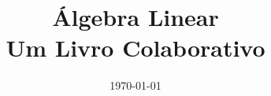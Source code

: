 \documentclass[a4paper]{book}
\newif\ifispdf        %
\theoremstyle{plain}
\theoremstyle{definition}
\begin{document}
\newcommand{\dir}{.} 

\frontmatter

\title{Álgebra Linear\\\small{Um Livro Colaborativo}}
\author{}
\date{\today}

\ifispdf
\addcontentsline{toc}{chapter}{Capa}
\fi

\maketitle







\ifispdf
\tableofcontents
\addcontentsline{toc}{chapter}{Sumário}
\fi

\mainmatter















\backmatter
\end{document}

